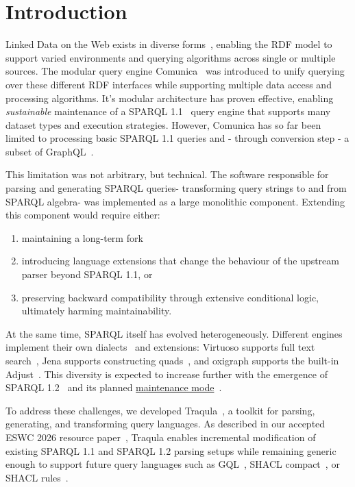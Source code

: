 \documentclass[runningheads]{llncs}
\begin{document}
    \section{Introduction}
    \label{introduction}

    Linked Data on the Web exists in diverse forms~\cite{spec:sparqlprot,tpf,smartkg},
    enabling the RDF model to support varied environments and querying
    algorithms across single or multiple sources. The modular query engine
    Comunica~\cite{comunica} was introduced to unify querying
    over these different RDF interfaces while supporting multiple data
    access and processing algorithms. It's modular architecture has proven
    effective, enabling \emph{sustainable} maintenance of a
    SPARQL 1.1~\cite{spec:sparqllang} query engine that
    supports many dataset types and execution strategies. However, Comunica
    has so far been limited to processing basic SPARQL 1.1 queries and
    - through conversion step - a subset of GraphQL~\cite{graphql-ld}.

    This limitation was not arbitrary, but technical. The software
    responsible for parsing and generating SPARQL queries- transforming query
    strings to and from SPARQL algebra- was implemented as a large monolithic
    component. Extending this component would require either:
    \begin{enumerate}
      \item maintaining a long-term fork
      \item introducing language extensions that change the behaviour of the upstream parser beyond SPARQL 1.1, or
      \item preserving backward compatibility through extensive conditional logic, ultimately harming maintainability.
    \end{enumerate}

    At the same time, SPARQL itself has evolved heterogeneously. Different engines implement their own
    dialects~\cite{geosparql,tsparql} and extensions: Virtuoso supports full
    text search~\cite{virtuoso-full-text-search}, Jena supports
    constructing quads~\cite{jena-construct-quad}, and oxigraph supports
    the built-in Adjust~\cite{sparql-adjust,oxigraph-adjust}. This diversity is expected to increase further
    with the emergence of SPARQL 1.2~\cite{sparql-1-2} and
    its planned \href{https://github.com/w3c/sparql-dev/issues/32\#issuecomment-2621209920}{maintenance
    mode}~\cite{rdf12-charter}.

    To address these challenges, we developed Traqula~\cite{traqula}, a toolkit for parsing,
    generating, and transforming query languages. As described in our accepted ESWC 2026 resource paper~\cite{traqula}, Traqula
    enables incremental modification of existing SPARQL 1.1 and SPARQL 1.2
    parsing setups while remaining generic enough to support future query
    languages such as GQL~\cite{iso-gql},
    SHACL compact~\cite{shacl-compact}, or SHACL rules~\cite{shacl-rules}.
\end{document}
